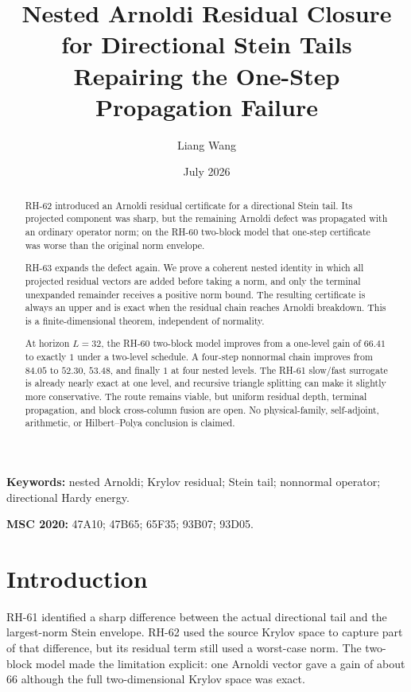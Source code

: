 \documentclass[11pt]{article}
\title{Nested Arnoldi Residual Closure for Directional Stein Tails\\
\large Repairing the One-Step Propagation Failure}
\author{Liang Wang}
\date{July 2026}
\begin{document}
\maketitle

\begin{abstract}
RH-62 introduced an Arnoldi residual certificate for a directional Stein
tail.  Its projected component was sharp, but the remaining Arnoldi defect
was propagated with an ordinary operator norm; on the RH-60 two-block model
that one-step certificate was worse than the original norm envelope.

RH-63 expands the defect again.  We prove a coherent nested identity in which
all projected residual vectors are added before taking a norm, and only the
terminal unexpanded remainder receives a positive norm bound.  The resulting
certificate is always an upper and is exact when the residual chain reaches
Arnoldi breakdown.  This is a finite-dimensional theorem, independent of
normality.

At horizon $L=32$, the RH-60 two-block model improves from a one-level gain
of $66.41$ to exactly $1$ under a two-level schedule.  A four-step
nonnormal chain improves from $84.05$ to $52.30$, $53.48$, and finally $1$
at four nested levels.  The RH-61 slow/fast surrogate is already nearly
exact at one level, and recursive triangle splitting can make it slightly
more conservative.  The route remains viable, but uniform residual depth,
terminal propagation, and block cross-column fusion are open.  No
physical-family, self-adjoint, arithmetic, or Hilbert--Polya conclusion is
claimed.
\end{abstract}

\noindent\textbf{Keywords:} nested Arnoldi; Krylov residual; Stein tail;
nonnormal operator; directional Hardy energy.

\medskip
\noindent\textbf{MSC 2020:} 47A10; 47B65; 65F35; 93B07; 93D05.

\section{Introduction}

RH-61 identified a sharp difference between the actual directional tail and
the largest-norm Stein envelope.  RH-62 used the source Krylov space to
capture part of that difference, but its residual term still used a
worst-case norm.  The two-block model made the limitation explicit:
one Arnoldi vector gave a gain of about $66$ although the full two-dimensional
Krylov space was exact.
\end{document}
